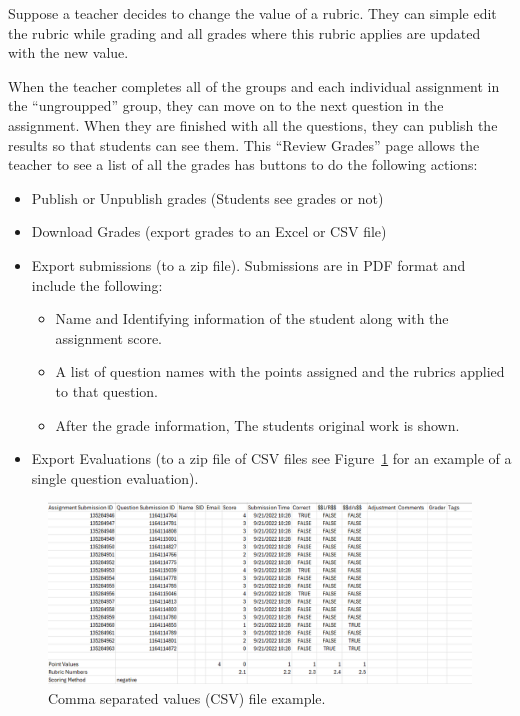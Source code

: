 \documentclass[ms,twoside,print]{nuthesis}
\begin{document}
Suppose a teacher decides to change the value of a rubric. They can simple edit the rubric while grading and all grades where this rubric applies are updated with the new value.

When the teacher completes all of the groups and each individual assignment in the ``ungroupped'' group, they can move on to the next question in the assignment. When they are finished with all the questions, they can publish the results so that students can see them. This ``Review Grades'' page allows the teacher to see a list of all the grades has buttons to do the following actions:

\begin{itemize}
    \item Publish or Unpublish grades (Students see grades or not)
    \item Download Grades (export grades to an Excel or CSV file)
    \item Export submissions (to a zip file). Submissions are in PDF format and include the following:
    \begin{itemize}
        \item Name and Identifying information of the student along with the assignment score.
        \item A list of question names with the points assigned and the rubrics applied to that question. 
        \item After the grade information, The students original work is shown.
    \end{itemize}
    \item Export Evaluations (to a zip file of CSV files see Figure~\ref{fig:evaluation-export} for an example of a single question evaluation). 
\end{itemize}

\begin{figure}[htb]
    \centering
    \includegraphics[width=\textwidth]{images/evaluation-exports.png}
    \caption{Comma separated values (CSV) file example.}\label{fig:evaluation-export}
\end{figure}
\end{document}
